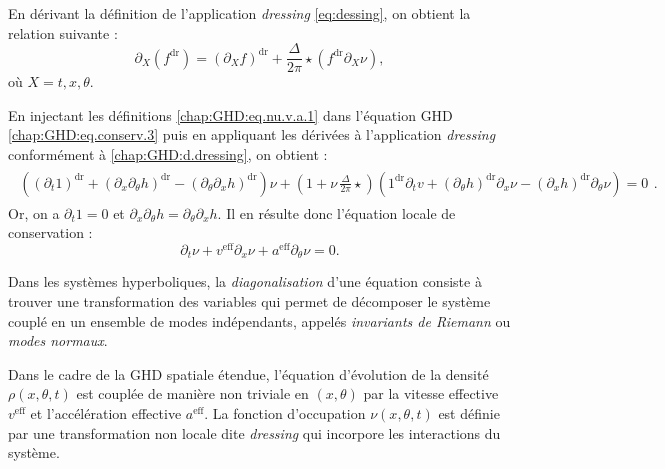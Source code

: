 En dérivant la définition de l'application \emph{dressing} \eqref{eq:dessing}, on obtient la relation suivante :
\begin{equation}\label{chap:GHD:d.dressing}
	\partial_X(f^{\mathrm{dr}}) = \left (\partial_X f \right )^{\mathrm{dr}} + \frac{\Delta}{2\pi} \star ( f^{\mathrm{dr}} \partial_X \nu ), 	
\end{equation}
où \(X = t, x, \theta\).

\medskip

En injectant les définitions \eqref{chap:GHD:eq.nu.v.a.1} dans l'équation GHD \eqref{chap:GHD:eq.conserv.3} puis en appliquant les dérivées à l'application \emph{dressing} conformément à \eqref{chap:GHD:d.dressing}, on obtient :  
\begin{eqnarray}
	\begin{array}{c}\left ( \left(\partial_t 1 \right)^{\mathrm{dr}} + \left(\partial_x  \partial_\theta h  \right)^{\mathrm{dr}} - \left(\partial_\theta  \partial_x h  \right)^{\mathrm{dr}} \right ) \nu + \left ( 1 + \nu \,  \frac{\Delta}{2 \pi } \star  \right ) \left ( 1^{\mathrm{dr}} \partial_t v +  \left ( \partial_\theta h \right )^{\mathrm{dr}} \partial_x \nu -  \left ( \partial_x h \right )^{\mathrm{dr}} \partial_\theta \nu\right ) = 0  \end{array}. 
\end{eqnarray}
Or, on a \(\partial_t 1 = 0\) et \(\partial_x \partial_\theta h = \partial_\theta \partial_x h\). Il en résulte donc l'équation locale de conservation :  
\begin{equation}
	\partial_t \nu + v^{\mathrm{eff}}\partial_x \nu
	+ a^{\mathrm{eff}} \partial_\theta \nu = 0.
\end{equation}  

\medskip

Dans les systèmes hyperboliques, la \emph{diagonalisation} d'une équation consiste à trouver une transformation des variables qui permet de décomposer le système couplé en un ensemble de modes indépendants, appelés \emph{invariants de Riemann} ou \emph{modes normaux}. 

\medskip

Dans le cadre de la GHD spatiale étendue, l'équation d'évolution de la densité \(\rho(x,\theta,t)\) est couplée de manière non triviale en \((x,\theta)\) par la vitesse effective \(v^{\mathrm{eff}}\) et l'accélération effective \(a^{\mathrm{eff}}\). La fonction d'occupation \(\nu(x,\theta,t)\) est définie par une transformation non locale dite \emph{dressing} qui incorpore les interactions du système.

